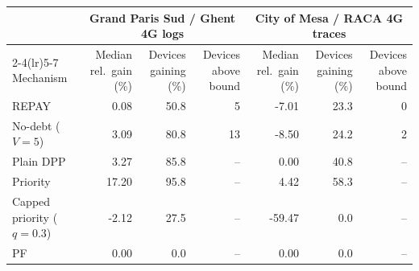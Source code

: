\begin{tabular}{lrrrrrr}
\toprule
 & \multicolumn{3}{c}{Grand Paris Sud / Ghent 4G logs} & \multicolumn{3}{c}{City of Mesa / RACA 4G traces} \\
\cmidrule(lr){2-4}\cmidrule(lr){5-7}
Mechanism & Median rel.\ gain (\%) & Devices gaining (\%) & Devices above bound & Median rel.\ gain (\%) & Devices gaining (\%) & Devices above bound \\
\midrule
REPAY & 0.08 & 50.8 & 5 & -7.01 & 23.3 & 0 \\
No-debt ($V=5$) & 3.09 & 80.8 & 13 & -8.50 & 24.2 & 2 \\
Plain DPP & 3.27 & 85.8 & -- & 0.00 & 40.8 & -- \\
Priority & 17.20 & 95.8 & -- & 4.42 & 58.3 & -- \\
Capped priority ($q=0.3$) & -2.12 & 27.5 & -- & -59.47 & 0.0 & -- \\
PF & 0.00 & 0.0 & -- & 0.00 & 0.0 & -- \\
\bottomrule
\end{tabular}
